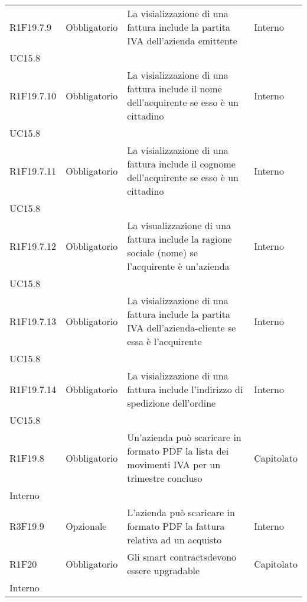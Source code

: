 \begin{longtable}{ >{\centering}p{} >{\centering}p{}
		>{\raggedright}p{} >{\centering}p{}}
	R1F19.7.9	&	Obbligatorio	&	La visializzazione di una fattura include la partita IVA dell'azienda emittente	&	Interno\\ UC15.8	\tabularnewline
	R1F19.7.10	&	Obbligatorio	&	La visializzazione di una fattura include il nome dell'acquirente se esso è un cittadino	&	Interno\\ UC15.8	\tabularnewline
	R1F19.7.11	&	Obbligatorio	&	La visializzazione di una fattura include il cognome dell'acquirente se esso è un cittadino	&	Interno\\ UC15.8	\tabularnewline
	R1F19.7.12	&	Obbligatorio	&	La visualizzazione di una fattura include la ragione sociale (nome) se l'acquirente è un'azienda 	&	Interno\\ UC15.8	\tabularnewline
	R1F19.7.13	&	Obbligatorio	&	La visializzazione di una fattura include la partita IVA dell'azienda-cliente se essa è l'acquirente	&	Interno\\ UC15.8	\tabularnewline
	R1F19.7.14	&	Obbligatorio	&	La visializzazione di una fattura include l'indirizzo di spedizione dell'ordine	&	Interno\\ UC15.8	\tabularnewline
	R1F19.8	&	Obbligatorio	&	Un'azienda può scaricare in formato PDF la lista dei movimenti IVA per un trimestre concluso	&	Capitolato\\ Interno	\tabularnewline
	R3F19.9	&	Opzionale	&	L'azienda può scaricare in formato PDF la fattura relativa ad un acquisto	&	Interno	\tabularnewline
	R1F20	&	Obbligatorio	&	Gli smart contracts\glosp devono essere upgradable	&	Capitolato\\ Interno	\tabularnewline
	
	
	
\end{longtable}

